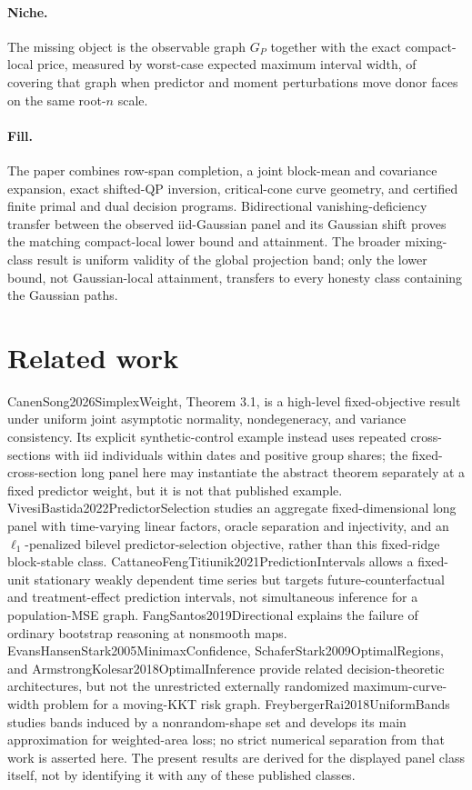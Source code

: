 \documentclass{article}
\begin{document}
\paragraph{Niche.} The missing object is the observable graph \(G_P\) together with the exact compact-local price, measured by worst-case expected maximum interval width, of covering that graph when predictor and moment perturbations move donor faces on the same root-\(n\) scale.

\paragraph{Fill.} The paper combines row-span completion, a joint block-mean and covariance expansion, exact shifted-QP inversion, critical-cone curve geometry, and certified finite primal and dual decision programs. Bidirectional vanishing-deficiency transfer between the observed iid-Gaussian panel and its Gaussian shift proves the matching compact-local lower bound and attainment. The broader mixing-class result is uniform validity of the global projection band; only the lower bound, not Gaussian-local attainment, transfers to every honesty class containing the Gaussian paths.

\section{Related work}

CanenSong2026SimplexWeight, Theorem 3.1, is a high-level fixed-objective result under uniform joint asymptotic normality, nondegeneracy, and variance consistency. Its explicit synthetic-control example instead uses repeated cross-sections with iid individuals within dates and positive group shares; the fixed-cross-section long panel here may instantiate the abstract theorem separately at a fixed predictor weight, but it is not that published example. VivesiBastida2022PredictorSelection studies an aggregate fixed-dimensional long panel with time-varying linear factors, oracle separation and injectivity, and an \(\ell_1\)-penalized bilevel predictor-selection objective, rather than this fixed-ridge block-stable class. CattaneoFengTitiunik2021PredictionIntervals allows a fixed-unit stationary weakly dependent time series but targets future-counterfactual and treatment-effect prediction intervals, not simultaneous inference for a population-MSE graph. FangSantos2019Directional explains the failure of ordinary bootstrap reasoning at nonsmooth maps. EvansHansenStark2005MinimaxConfidence, SchaferStark2009OptimalRegions, and ArmstrongKolesar2018OptimalInference provide related decision-theoretic architectures, but not the unrestricted externally randomized maximum-curve-width problem for a moving-KKT risk graph. FreybergerRai2018UniformBands studies bands induced by a nonrandom-shape set and develops its main approximation for weighted-area loss; no strict numerical separation from that work is asserted here. The present results are derived for the displayed panel class itself, not by identifying it with any of these published classes.
\end{document}
